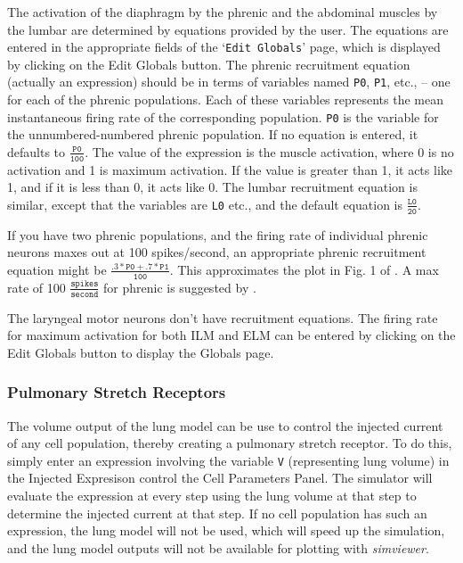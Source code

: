 \documentclass[12pt,openany,oneside]{book}
\newcommand{\ticode}[1]{\texttt{#1}}
\newcommand{\tmcode}[1]{\mathtt{#1}}
\newcommand{\tisamp}[1]{`\texttt{#1}'}
\newcommand{\prog}[1]{\textit{{#1}}}
\begin{document}
The activation of the diaphragm by the phrenic and the abdominal
muscles by the lumbar are determined by equations provided by the
user. The equations are entered in the appropriate fields of the
\tisamp{Edit Globals} page, which is displayed 
by clicking on the Edit Globals button.
The phrenic recruitment equation (actually an expression) 
should be in terms of
variables named \ticode{P0}, \ticode{P1}, etc., -- one for each of the
phrenic populations. Each of these variables represents the mean
instantaneous firing rate of the corresponding population.
\ticode{P0} is the variable for the unnumbered-numbered phrenic population.
If no equation is entered, it defaults to $\tmcode{\tfrac{P0}{100}}$. The value
of the expression is the muscle activation, where 0 is no activation
and 1 is maximum activation. If the value is greater than 1, it acts
like 1, and if it is less than 0, it acts like 0. The lumbar
recruitment equation is similar, except that the variables are
\ticode{L0} etc., and the default equation is $\tmcode{\tfrac{L0}{20}}$.

If you have two phrenic populations, and the firing rate of individual
phrenic neurons maxes out at 100 spikes/second, an appropriate phrenic
recruitment equation might be $\tmcode{\tfrac{.3*P0+.7*P1}{100}}$. This
approximates the plot in Fig. 1 of \citet{Mantilla201157}.
A max rate of 100 $\tmcode{\tfrac{spikes}{second}}$ for phrenic is suggested by
\citet{springerlink:10.1007/BF00235915}.

The laryngeal motor neurons don't have recruitment equations. 
The firing rate for maximum
activation for both ILM and ELM can be entered by clicking
on the Edit Globals button to display the Globals page.

\subsubsection{Pulmonary Stretch Receptors}

The volume output of the lung model can be use to control the injected
current of any cell population, thereby creating a pulmonary stretch
receptor. To do this, simply enter an expression involving the variable
\ticode{V} (representing lung volume) in the Injected Expresison control 
the Cell Parameters Panel. The
simulator will evaluate the expression at every step using the lung
volume at that step to determine the injected current at that step. If
no cell population has such an expression, the lung model will not be
used, which will speed up the simulation, and the lung model outputs
will not be available for plotting with \prog{simviewer}.
\end{document}
